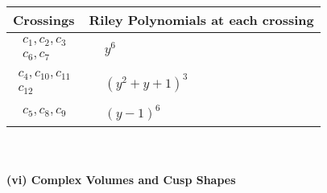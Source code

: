 \documentclass[1p]{elsarticle_modified}
\theoremstyle{definition}
\begin{document}
\begin{tabular}{m{50pt}|m{274pt}}
Crossings & \hspace{64pt}Riley Polynomials at each crossing \\
\hline $$\begin{aligned}c_{1},c_{2},c_{3}\\c_{6},c_{7}\end{aligned}$$&$\begin{aligned}
&y^6
\end{aligned}$\\
\hline $$\begin{aligned}c_{4},c_{10},c_{11}\\c_{12}\end{aligned}$$&$\begin{aligned}
&(y^2+y+1)^3
\end{aligned}$\\
\hline $$\begin{aligned}c_{5},c_{8},c_{9}\end{aligned}$$&$\begin{aligned}
&(y-1)^6
\end{aligned}$\\
\hline
\end{tabular}\\~\\
\newpage\flushleft \textbf{(vi) Complex Volumes and Cusp Shapes}
\end{document}
